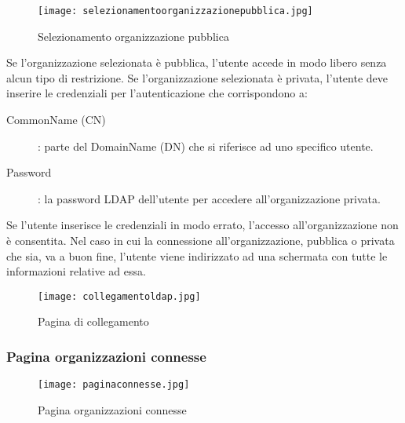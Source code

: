 \documentclass[../manuale-utente.tex]{subfiles}
\begin{document}
 \begin{figure}[H]
   \centering
   \texttt{[image: selezionamentoorganizzazionepubblica.jpg]}
   \caption{Selezionamento organizzazione pubblica}%
   \label{fig:mobile_app_selezionamento_organizzazione_pubblica}
 \end{figure}
Se l'organizzazione selezionata è pubblica, l'utente accede in modo libero senza alcun tipo di restrizione.
Se l'organizzazione selezionata è privata, l'utente deve inserire le credenziali per l'autenticazione  che corrispondono a:
\begin{description}
  \item[CommonName (CN)]: parte del DomainName (DN) che si riferisce ad uno specifico utente. 
  \item[Password]: la password LDAP dell'utente per accedere all'organizzazione privata.
\end{description}
Se l'utente inserisce le credenziali in modo errato, l'accesso all'organizzazione non è consentita.
Nel caso in cui la connessione all'organizzazione, pubblica o privata che sia, va a buon fine, l'utente viene indirizzato ad una schermata con tutte le informazioni relative ad essa.


\begin{figure}[H]
  \centering
  \texttt{[image: collegamentoldap.jpg]}
  \caption{Pagina di collegamento}%
  \label{fig:mobile_app_pagina_collegamento_ldap}
\end{figure}


\subsubsection{Pagina organizzazioni connesse}%
\label{subs:pagina_organizzazioni_connesse}

 \begin{figure}[H]
   \centering
   \texttt{[image: paginaconnesse.jpg]}
   \caption{Pagina organizzazioni connesse}%
   \label{fig:mobile_app_pagina_organizzazioni_connesse}
 \end{figure}
\end{document}
